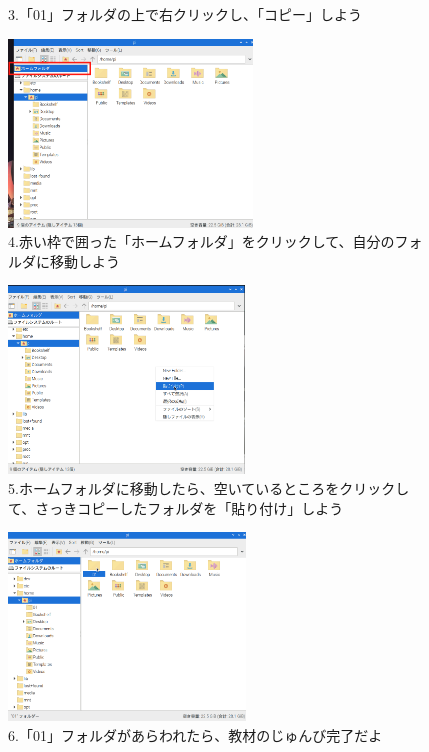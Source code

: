 \documentclass[a4paper,12pt]{jarticle}
\begin{document}
\begin{figure}
\begin{minipage}{\textwidth}
\begin{minipage}{0.45\linewidth}
      3.「01」フォルダの上で右クリックし、「コピー」しよう
    \end{minipage}
    \hfill
    \vspace{20pt}
    \begin{minipage}{0.45\linewidth}
      \includegraphics[height=5cm]{textbook-img1013.png}\\
      4.赤い枠で囲った「ホームフォルダ」をクリックして、自分のフォルダに移動しよう
    \end{minipage}    \begin{minipage}{0.45\linewidth}
      \includegraphics[height=5cm]{textbook-img1014.png}\\
      5.ホームフォルダに移動したら、空いているところをクリックして、さっきコピーしたフォルダを「貼り付け」しよう
    \end{minipage}
    \hfill
    \vspace{20pt}
    \begin{minipage}{0.45\linewidth}
      \includegraphics[height=5cm]{textbook-img1015.png}\\
      6.「01」フォルダがあらわれたら、教材のじゅんび完了だよ
    \end{minipage}

  \end{minipage}

  \bigskip

\end{figure}
\end{document}
